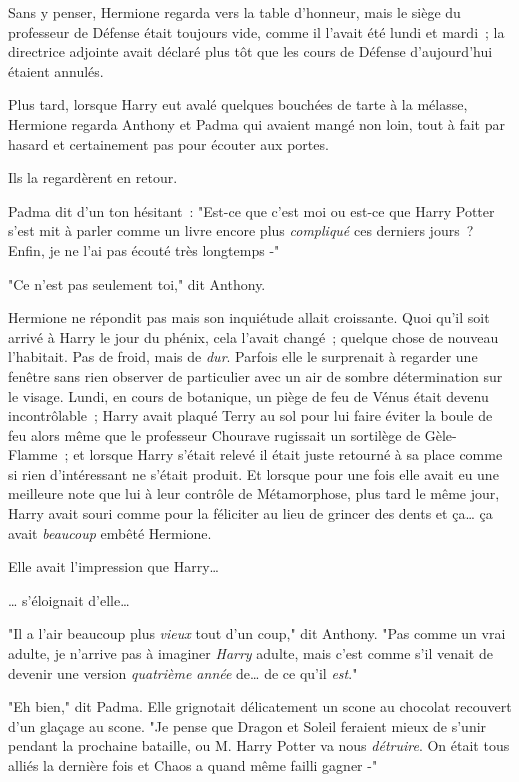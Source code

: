 Sans y penser, Hermione regarda vers la table d'honneur, mais le siège du professeur de Défense était toujours vide, comme il l'avait été lundi et mardi~; la directrice adjointe avait déclaré plus tôt que les cours de Défense d'aujourd'hui étaient annulés.

Plus tard, lorsque Harry eut avalé quelques bouchées de tarte à la mélasse, Hermione regarda Anthony et Padma qui avaient mangé non loin, tout à fait par hasard et certainement pas pour écouter aux portes.

Ils la regardèrent en retour.

Padma dit d'un ton hésitant~: "Est-ce que c'est moi ou est-ce que Harry Potter s'est mit à parler comme un livre encore plus \emph{compliqué} ces derniers jours~? Enfin, je ne l'ai pas écouté très longtemps -"

"Ce n'est pas seulement toi," dit Anthony.

Hermione ne répondit pas mais son inquiétude allait croissante. Quoi qu'il soit arrivé à Harry le jour du phénix, cela l'avait changé~; quelque chose de nouveau l'habitait. Pas de froid, mais de \emph{dur}. Parfois elle le surprenait à regarder une fenêtre sans rien observer de particulier avec un air de sombre détermination sur le visage. Lundi, en cours de botanique, un piège de feu de Vénus était devenu incontrôlable~; Harry avait plaqué Terry au sol pour lui faire éviter la boule de feu alors même que le professeur Chourave rugissait un sortilège de Gèle-Flamme~; et lorsque Harry s'était relevé il était juste retourné à sa place comme si rien d'intéressant ne s'était produit. Et lorsque pour une fois elle avait eu une meilleure note que lui à leur contrôle de Métamorphose, plus tard le même jour, Harry avait souri comme pour la féliciter au lieu de grincer des dents et ça… ça avait \emph{beaucoup} embêté Hermione.

Elle avait l'impression que Harry…

… s'éloignait d'elle…

"Il a l'air beaucoup plus \emph{vieux} tout d'un coup," dit Anthony. "Pas comme un vrai adulte, je n'arrive pas à imaginer \emph{Harry} adulte, mais c'est comme s'il venait de devenir une version \emph{quatrième année} de… de ce qu'il \emph{est}."

"Eh bien," dit Padma. Elle grignotait délicatement un scone au chocolat recouvert d'un glaçage au scone. "Je pense que Dragon et Soleil feraient mieux de s'unir pendant la prochaine bataille, ou M. Harry Potter va nous \emph{détruire}. On était tous alliés la dernière fois et Chaos a quand même failli gagner -"

